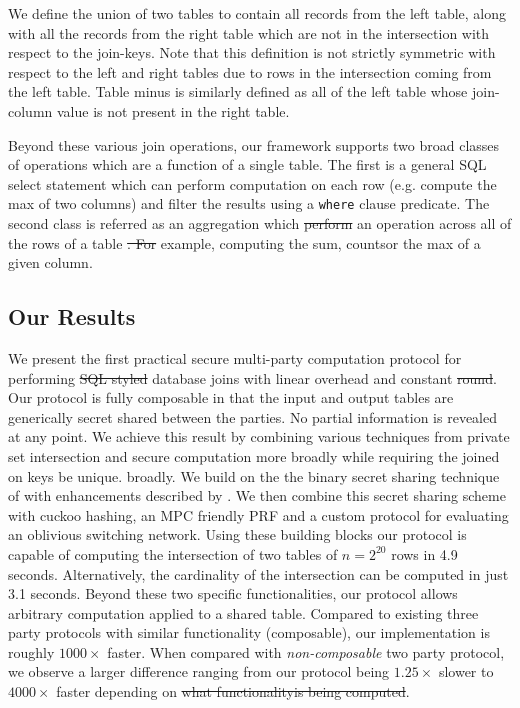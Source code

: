 \documentclass[11pt,letterpaper]{article}
\providecommand{\DIFaddtex}[1]{{\protect\color{blue}\uwave{#1}}} %
\providecommand{\DIFdeltex}[1]{{\protect\color{red}\sout{#1}}}                      %
\providecommand{\DIFaddbegin}{} %
\providecommand{\DIFaddend}{} %
\providecommand{\DIFdelbegin}{} %
\providecommand{\DIFdelend}{} %
\providecommand{\DIFadd}[1]{\texorpdfstring{\DIFaddtex{#1}}{#1}} %
\providecommand{\DIFdel}[1]{\texorpdfstring{\DIFdeltex{#1}}{}} %
\begin{document}
We define the union of two tables to contain all records from the left table, along with all the records from the right table which are not in the intersection with respect to the join-keys. Note that this definition is not strictly symmetric with respect to the left and right tables due to rows in the intersection coming from the left table. Table minus is similarly defined as all of the left table whose join-column value is not present in the right table. 

Beyond these various join operations, our framework supports two broad classes of operations which are a function of a single table. The first is a general SQL select statement which can perform computation on each row (e.g. compute the max of two columns) and filter the results using a \texttt{where} clause predicate. The second class is referred \DIFaddbegin \DIFadd{to }\DIFaddend as an aggregation which \DIFdelbegin \DIFdel{perform }\DIFdelend \DIFaddbegin \DIFadd{performs }\DIFaddend an operation across all of the rows of a table \DIFdelbegin \DIFdel{. For }\DIFdelend \DIFaddbegin \DIFadd{--- for }\DIFaddend example, computing the sum, counts\DIFaddbegin \DIFadd{, }\DIFaddend or the max of a given column. 
\subsection{Our Results}

We present the first practical secure multi-party computation protocol for performing \DIFdelbegin \DIFdel{SQL styled }\DIFdelend \DIFaddbegin \DIFadd{SQL-style }\DIFaddend database joins with linear overhead and constant \DIFdelbegin \DIFdel{round}\DIFdelend \DIFaddbegin \DIFadd{rounds}\DIFaddend . Our protocol is fully composable in that the input and output tables are generically secret shared between the parties. 
\iffullversion
	No partial information is revealed at any point. 
\fi
	We achieve this result by combining various techniques from private set intersection and secure computation more 
\iffullversion 
	broadly while requiring the joined on keys be unique.
\else
	broadly.
\fi
 We build on the the binary secret sharing technique of \cite{highthroughput} with enhancements described by \cite{aby3}. We then combine this secret sharing scheme with cuckoo hashing\cite{usenix:PSZ14}, an MPC friendly PRF\cite{lowmc} and a custom protocol for evaluating an oblivious switching network\cite{MS13}. Using these building blocks our protocol is capable of computing the intersection of two tables of $n=2^{20}$ rows in 4.9 seconds. 
\iffullversion 
	Alternatively, the cardinality of the intersection can be computed in just 3.1 seconds.
\fi
  Beyond these two specific functionalities, our protocol allows arbitrary computation applied to a shared table. Compared to existing three party protocols with similar functionality (composable), our implementation is roughly $1000\times$ faster. When compared with \emph{non-composable} two party protocol, we observe a larger difference ranging from our protocol being $1.25\times$ slower to $4000\times$ faster depending on \DIFdelbegin \DIFdel{what functionalityis being computed}\DIFdelend \DIFaddbegin \DIFadd{the functionality}\DIFaddend . 
\end{document}
